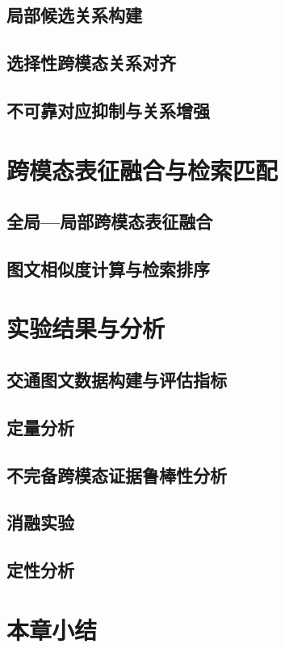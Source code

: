 \subsection{局部候选关系构建}

\subsection{选择性跨模态关系对齐}

\subsection{不可靠对应抑制与关系增强}

\section{跨模态表征融合与检索匹配}

\subsection{全局—局部跨模态表征融合}

\subsection{图文相似度计算与检索排序}

\section{实验结果与分析}

\subsection{交通图文数据构建与评估指标}

\subsection{定量分析}

\subsection{不完备跨模态证据鲁棒性分析}

\subsection{消融实验}

\subsection{定性分析}

\section{本章小结}
